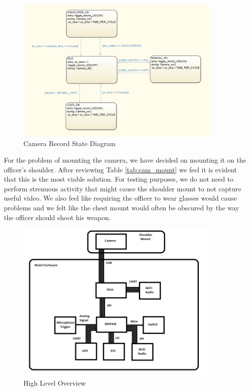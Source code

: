 \documentclass[12pt]{article}
\begin{document}
\begin{figure}[h!]
    \centering
    \includegraphics[width=0.9\textwidth]{state_diagram}
    \caption{Camera Record State Diagram}
\end{figure}

For the problem of mounting the camera, we have decided on mounting it on the
officer's shoulder. After reviewing Table \ref{tab:cam_mount} we feel it is
evident that this is the most viable solution. For testing purposes, we do not
need to perform strenuous activity that might cause the shoulder mount to not
capture useful video. We also feel like requiring the officer to wear glasses
would cause problems and we felt like the chest mount would often be obscured
by the way the officer should shoot his weapon.

\begin{figure}[h!]
    \centering
    \includegraphics[width=0.9\textwidth]{overview}
    \caption{High Level Overview}
\end{figure}
\end{document}
